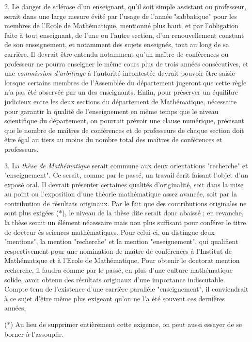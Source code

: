 \documentclass[11pt,a4paper]{article}
\begin{document}
2. Le danger de sclérose d'un enseignant, qu'il soit simple assistant ou professeur, serait dans une large mesure évité par l'usage de l'année "sabbatique" pour les membres de l'Ecole de Mathématique, mentionné plus haut, et par l'obligation faite à tout enseignant, de l'une ou l'autre section, d'un renouvellement constant de son enseignement, et notamment des sujets enseignés, tout au long de sa carrière. Il devrait être entendu notamment qu'un maître de conférences ou professeur ne pourra enseigner le même cours plus de trois années consécutives, et une \emph{commission d'arbitrage} à l'autorité incontestée devrait pouvoir être saisie lorsque certains membres de l'Assemblée du département jugeront que cette règle n'a pas été observée par un des enseignants. Enfin, pour préserver un équilibre judicieux entre les deux sections du département de Mathématique, nécessaire pour garantir la qualité de l'enseignement en même temps que le niveau scientifique du département, on pourrait prévoir une clause numérique, précisant que le nombre de maîtres de conférences et de professeurs de chaque section doit être égal au tiers au moins du nombre total des maîtres de conférences et professeurs.

3. La \emph{thèse de Mathématique} serait commune aux deux orientations "recherche" et "enseignement". Ce serait, comme par le passé, un travail écrit faisant l'objet d'un exposé oral. Il devrait présenter certaines qualités d'originalité, soit dans la mise au point ou l'exposition d'une théorie mathématique assez avancée, soit par la contribution de résultats originaux. Par le fait que des contributions originales ne sont plus exigées (*), le niveau de la thèse  dite serait donc abaissé ; en revanche, la thèse serait un élément nécessaire mais non plus suffisant pour conférer le titre de docteur ès sciences mathématiques. Pour celui-ci, on distingue deux "mentions", la mention "recherche" et la mention "enseignement", qui qualifient respectivement pour une nomination de maître de conférences à l'Institut de Mathématique et à l'Ecole de Mathématique. Pour obtenir le doctorat mention recherche, il faudra comme par le passé, en plus d'une culture mathématique solide, avoir obtenu des résultats originaux d'une importance indiscutable. Compte tenu de l'existence d'une carrière parallèle "enseignement", il conviendrait à ce sujet d'être même plus exigeant qu'on ne l'a été souvent ces dernières années,

(*) Au lieu de supprimer entièrement cette exigence, on peut aussi essayer de se borner à l'assouplir.
\end{document}
